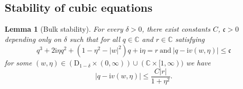 \documentclass[11pt]{article}
\newcommand{\ii}{\mathrm{i}}
\newcommand{\C}{\mathbb{C}}
\theoremstyle{plain}
\newtheorem{lemma}{Lemma}[section]
\theoremstyle{remark}
\numberwithin{equation}{section}
\begin{document}
	\subsection{Stability of cubic equations} \label{app:cubic_stability} 
	
	\begin{lemma}[Bulk stability]\label{lem:bulkstab}
		For every $\delta >0$, there exist constants 
		$C$, $\mathfrak{c} >0$ depending only on $\delta$ such that for all $q \in \C$ and $r \in \C$ satisfying 
		\begin{equation}\label{eq:q_r_equation} 
			q^3 + 2\ii\eta q^2 + \left(1-\eta^2 - |w|^2 \right) q +\ii \eta =r~\text{and}~ \left|q - \ii v(w,\eta) \right| \le \mathfrak{c}
		\end{equation}
		for some $(w,\eta) \in (\mathrm{D}_{1-\delta} \times (0,\infty))\cup (\C \times [1,\infty))$ we have 
		\begin{equation*}
			\left|q - \ii v(w,\eta) \right| \le \frac{C|r|}{1 + \eta^2}.
		\end{equation*}
	\end{lemma}
	
\end{document}
